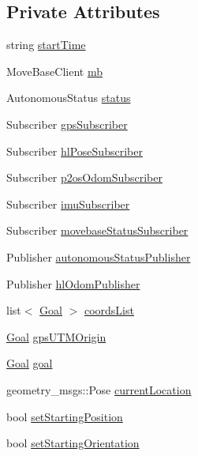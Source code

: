 \subsection*{\-Private \-Attributes}
\begin{DoxyCompactItemize}
\item 
string \hyperlink{classGoalProvider_a6329ae18effbfa5a6eddf9956851c973}{start\-Time}
\item 
\-Move\-Base\-Client \hyperlink{classGoalProvider_a903cb379ce27ab3072fc273f8d344b0b}{mb}
\item 
\-Autonomous\-Status \hyperlink{classGoalProvider_aecddfd46c7aba939da77c5a207a97039}{status}
\item 
\-Subscriber \hyperlink{classGoalProvider_a25af65ca4565bee69daba5c9b2c11b8f}{gps\-Subscriber}
\item 
\-Subscriber \hyperlink{classGoalProvider_a2322770657c65da748d21c844c787f5e}{hl\-Pose\-Subscriber}
\item 
\-Subscriber \hyperlink{classGoalProvider_a5f5494e3cd35116f170082bce82201e5}{p2os\-Odom\-Subscriber}
\item 
\-Subscriber \hyperlink{classGoalProvider_a86cffa9e45e8fdb0813964ca79e4a327}{imu\-Subscriber}
\item 
\-Subscriber \hyperlink{classGoalProvider_a16a3122fd49b058c08a56e8eac93c08b}{movebase\-Status\-Subscriber}
\item 
\-Publisher \hyperlink{classGoalProvider_a8827c194d8a7568578307c30b5947276}{autonomous\-Status\-Publisher}
\item 
\-Publisher \hyperlink{classGoalProvider_a24a2ea4ae8b62c0086602471a57b74d3}{hl\-Odom\-Publisher}
\item 
list$<$ \hyperlink{classGoal}{\-Goal} $>$ \hyperlink{classGoalProvider_a81829c05683244c4450e548129e4cb1d}{coords\-List}
\item 
\hyperlink{classGoal}{\-Goal} \hyperlink{classGoalProvider_a274c71aaace4fb19551ecfd58356744a}{gps\-U\-T\-M\-Origin}
\item 
\hyperlink{classGoal}{\-Goal} \hyperlink{classGoalProvider_a7c8eb368dbd85c32f1000fead79190dc}{goal}
\item 
geometry\-\_\-msgs\-::\-Pose \hyperlink{classGoalProvider_a043ea6fbbd89e54ea39501ae30da8774}{current\-Location}
\item 
bool \hyperlink{classGoalProvider_aae2c69715ab4565f5d0e96cd16411444}{set\-Starting\-Position}
\item 
bool \hyperlink{classGoalProvider_a94c6c903648ec2ff61396d04686bc466}{set\-Starting\-Orientation}

\end{DoxyCompactItemize}
